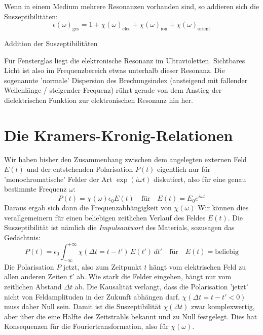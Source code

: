 Wenn in einem Medium mehrere Resonanzen vorhanden sind, so addieren sich die Suszeptibilitäten:
\begin{equation}
\epsilon(\omega)_\text{ges} = 1 + \chi(\omega)_\text{elec} +  \chi(\omega)_\text{ion}  + \chi(\omega)_\text{orient}
\end{equation}

\begin{marginfigure}

\caption{Addition der Suszeptibilitäten}
\end{marginfigure}

Für Fensterglas liegt die elektronische Resonanz im Ultravioletten. Sichtbares Licht ist also im Frequenzbereich etwas unterhalb dieser Resonanz. Die sogenannte 'normale' Dispersion des Brechungsindex (ansteigend mit fallender Wellenlänge / steigender Frequenz) rührt gerade von dem Anstieg der dielektrischen Funktion zur elektronischen Resonanz hin her.


\section{Die Kramers-Kronig-Relationen}

Wir haben bisher den Zusammenhang zwischen dem angelegten externen Feld $E(t)$ und der entstehenden Polarisation $P(t)$ eigentlich nur für 'monochromatische' Felder der Art $\exp(i \omega t)$ diskutiert, also für eine genau bestimmte Frequenz $\omega$:
\begin{equation}
P(t) = \chi(\omega) \epsilon_0 E(t) \quad \text{für} \quad E(t) = E_0 e^{i \omega t}
\end{equation}
Daraus ergab sich dann die Frequenzabhängigkeit von $\chi(\omega)$ Wir können dies verallgemeinern für einen beliebigen zeitlichen Verlauf des Feldes  $E(t)$. Die Suszeptibilität ist nämlich die  \emph{Impulsantwort} des Materials, sozusagen das Gedächtnis:
\begin{equation}
P(t) = \epsilon_0 \int_{-\infty}^{+\infty} \chi( \Delta t = t - t') \, E(t') \, dt' \quad \text{für} \quad E(t) = \text{beliebig}
\end{equation}
Die Polarisation $P$ jetzt, also zum Zeitpunkt $t$ hängt vom elektrischen Feld zu allen anderen Zeiten $t'$ ab. Wie stark die Felder eingehen, hängt nur vom zeitlichen Abstand $\Delta t$ ab. Die Kausalität verlangt, dass die Polarisation 'jetzt' nicht von Feldamplituden in der Zukunft abhängen darf. $\chi( \Delta t = t - t' < 0) $ muss daher Null sein. Damit ist die Suszeptibilität $\chi( \Delta t ) $ zwar komplexwertig, aber über die eine Hälfte des Zeitstrahls bekannt und zu Null festgelegt. Dies hat Konsequenzen für die Fouriertransformation, also für $\chi(\omega)$.

